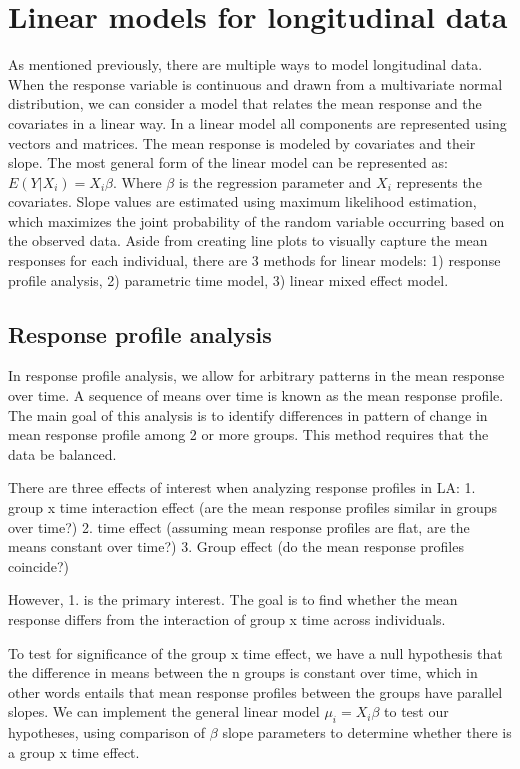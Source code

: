 \documentclass[12pt, twoside]{amherstthesis}
\theoremstyle{definition}
\theoremstyle{definition}
\theoremstyle{definition}
\theoremstyle{remark}
\begin{document}
\hypertarget{linear-models-for-longitudinal-data}{%
\section{Linear models for longitudinal data}\label{linear-models-for-longitudinal-data}}

As mentioned previously, there are multiple ways to model longitudinal data. When the response variable is continuous and drawn from a multivariate normal distribution, we can consider a model that relates the mean response and the covariates in a linear way. In a linear model all components are represented using vectors and matrices. The mean response is modeled by covariates and their slope. The most general form of the linear model can be represented as:
\(E(Y|X_i)=X_i\beta\). Where \(\beta\) is the regression parameter and \(X_i\) represents the covariates. Slope values are estimated using maximum likelihood estimation, which maximizes the joint probability of the random variable occurring based on the observed data. Aside from creating line plots to visually capture the mean responses for each individual, there are 3 methods for linear models: 1) response profile analysis, 2) parametric time model, 3) linear mixed effect model.

\hypertarget{response-profile-analysis}{%
\subsection{Response profile analysis}\label{response-profile-analysis}}

In response profile analysis, we allow for arbitrary patterns in the mean response over time. A sequence of means over time is known as the mean response profile. The main goal of this analysis is to identify differences in pattern of change in mean response profile among 2 or more groups. This method requires that the data be balanced.

There are three effects of interest when analyzing response profiles in LA:
1. group x time interaction effect (are the mean response profiles similar in groups over time?)
2. time effect (assuming mean response profiles are flat, are the means constant over time?)
3. Group effect (do the mean response profiles coincide?)

However, 1. is the primary interest. The goal is to find whether the mean response differs from the interaction of group x time across individuals.

To test for significance of the group x time effect, we have a null hypothesis that the difference in means between the n groups is constant over time, which in other words entails that mean response profiles between the groups have parallel slopes. We can implement the general linear model \(\mu_i = X_i\beta\) to test our hypotheses, using comparison of \(\beta\) slope parameters to determine whether there is a group x time effect.
\end{document}
